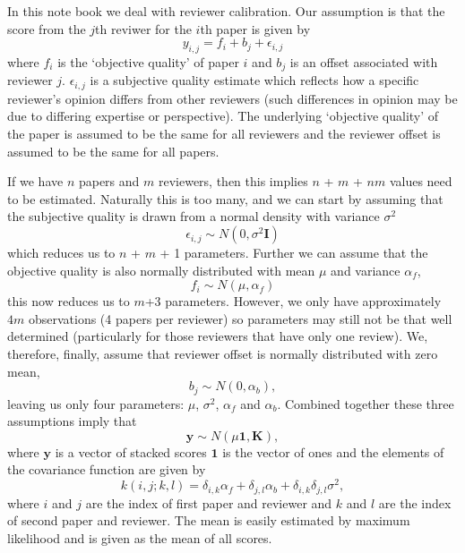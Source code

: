 \begin{flushright}
\end{flushright}

In this note book we deal with reviewer calibration. Our assumption is
that the score from the \(j\)th reviwer for the \(i\)th paper is given
by \[
y_{i,j} = f_i + b_j + \epsilon_{i, j}
\] where \(f_i\) is the `objective quality' of paper \(i\) and \(b_j\)
is an offset associated with reviewer \(j\). \(\epsilon_{i,j}\) is a
subjective quality estimate which reflects how a specific reviewer's
opinion differs from other reviewers (such differences in opinion may be
due to differing expertise or perspective). The underlying `objective
quality' of the paper is assumed to be the same for all reviewers and
the reviewer offset is assumed to be the same for all papers.

If we have \(n\) papers and \(m\) reviewers, then this implies \(n\) +
\(m\) + \(nm\) values need to be estimated. Naturally this is too many,
and we can start by assuming that the subjective quality is drawn from a
normal density with variance \(\sigma^2\) \[
\epsilon_{i, j} \sim N(0, \sigma^2 \mathbf{I})
\] which reduces us to \(n\) + \(m\) + 1 parameters. Further we can
assume that the objective quality is also normally distributed with mean
\(\mu\) and variance \(\alpha_f\), \[
f_i \sim N(\mu, \alpha_f)
\] this now reduces us to \(m\)+3 parameters. However, we only have
approximately \(4m\) observations (4 papers per reviewer) so parameters
may still not be that well determined (particularly for those reviewers
that have only one review). We, therefore, finally, assume that reviewer
offset is normally distributed with zero mean, \[
b_j \sim N(0, \alpha_b),
\] leaving us only four parameters: \(\mu\), \(\sigma^2\), \(\alpha_f\)
and \(\alpha_b\). Combined together these three assumptions imply that
\[
\mathbf{y} \sim N(\mu \mathbf{1}, \mathbf{K}),
\]
where \(\mathbf{y}\) is a vector of stacked scores \(\mathbf{1}\) is
the vector of ones and the elements of the covariance function are given
by \[
k(i,j; k,l) = \delta_{i,k} \alpha_f + \delta_{j,l} \alpha_b + \delta_{i, k}\delta_{j,l} \sigma^2,
\] where \(i\) and \(j\) are the index of first paper and reviewer and
\(k\) and \(l\) are the index of second paper and reviewer. The mean is
easily estimated by maximum likelihood and is given as the mean of all
scores.

